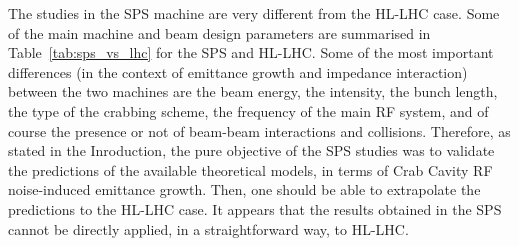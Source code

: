 The studies in the SPS machine are very different from the HL-LHC case. Some of the main machine and beam design parameters are summarised in Table~\ref{tab:sps_vs_lhc} for the SPS and HL-LHC. Some of the most important differences (in the context of emittance growth and impedance interaction) between the two machines are the beam energy, the intensity, the bunch length, the type of the crabbing scheme, the frequency of the main RF system, and of course the presence or not of beam-beam interactions and collisions. Therefore, as stated in the Inroduction, the pure objective of the SPS studies was to validate the predictions of the available theoretical models, in terms of Crab Cavity RF noise-induced emittance growth. Then, one should be able to extrapolate the predictions to the HL-LHC case. It appears that the results obtained in the SPS cannot be directly applied, in a straightforward way, to HL-LHC.

